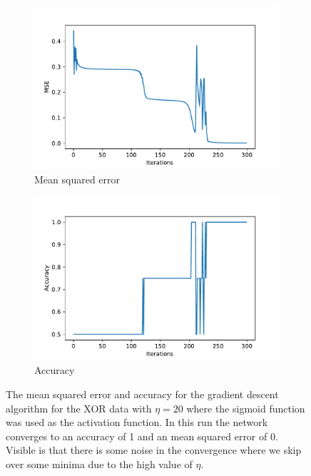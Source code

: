 \documentclass[10 pt, a4paper]{article}
\begin{document}
\begin{figure}[H] 
\begin{subfigure}[b]{0.5\textwidth}
  \centering
    \includegraphics[width=\textwidth]{xor_mse_noise}
  \caption{Mean squared error}
\end{subfigure}
\begin{subfigure}[b]{0.5\textwidth} 
  \centering
    \includegraphics[width=\textwidth]{xor_acc_noise}
  \caption{Accuracy}
\end{subfigure}
\caption{The mean squared error and accuracy for the gradient descent algorithm for the XOR data with $\eta = 20$ where the sigmoid function was used as the activation function. In this run the network converges to an accuracy of 1 and an mean squared error of 0. Visible is that there is some noise in the convergence where we skip over some minima due to the high value of $\eta$.}
  \label{fig:xormsenoise}
\end{figure}
\end{document}
